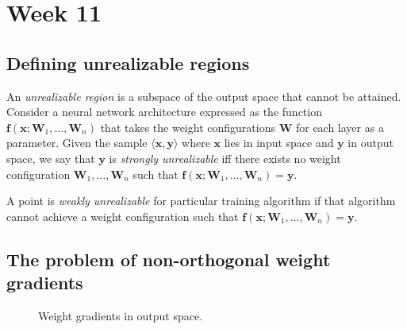 \documentclass{article}
\renewcommand\vec{\mathbf}
\begin{document}
\section{Week 11}
\subsection{Defining unrealizable regions}
An \textit{unrealizable region} is a subspace of the output space that cannot be attained. 
Consider a neural network architecture expressed as the function $\vec{f}(\vec{x}; \vec{W}_1, \dots, \vec{W}_n)$ that takes the weight configurations $\vec{W}$ for each layer as a parameter.
Given the sample $\langle \vec{x}, \vec{y}\rangle$ where $\vec{x}$ lies in input space and $\vec{y}$ in output space, we say that $\vec{y}$ is \textit{strongly unrealizable} iff there exists no weight configuration $\vec{W}_1,\dots,\vec{W}_n$ such that $\vec{f}(\vec{x};\vec{W}_1,\dots,\vec{W}_n)=\vec{y}$. 

A point is \textit{weakly unrealizable} for particular training algorithm if that algorithm cannot achieve a weight configuration such that $\vec{f}(\vec{x};\vec{W}_1,\dots,\vec{W}_n)=\vec{y}$.

\subsection{The problem of non-orthogonal weight gradients}

\begin{wrapfigure}{r}{.5\textwidth}
    \centering
    \caption{Weight gradients in output space.}
    \label{fig:week11:orthogonal}
\end{wrapfigure}
\end{document}
